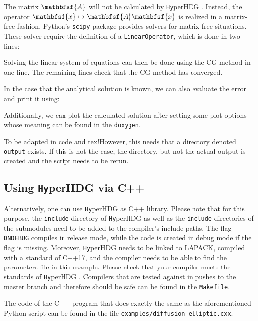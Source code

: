 \documentclass[a4paper, english, 12pt, reqno, draft]{amsart}
\theoremstyle{definition}
\theoremstyle{remark}
\numberwithin{equation}{section}
\newcommand{\hyperHDG}{{\fontfamily{pzc}\selectfont \texttt{Hy}\hspace{-1.5pt}perHDG }}
\newcommand{\vecc}[1]{\ensuremath{\mathbfsf{#1}}}
\newcommand{\code}[1]{\texttt{#1}}
\begin{document}
%
The matrix $\vecc A$ will not be calculated by \hyperHDG. Instead, the operator $\vecc x \mapsto \vecc A \vecc x$ is realized in a matrix-free fashion. Python's \code{scipy} package provides solvers for matrix-free situations. These solver require the definition of a \code{LinearOperator}, which is done in two lines:
%

%
Solving the linear system of equations can then be done using the CG method in one line. The remaining lines check that the CG method has converged.
%

%
In the case that the analytical solution is known, we can also evaluate the error and print it using:
%

%
Additionally, we can plot the calculated solution after setting some plot options whose meaning can be found in the \code{doxygen}.\begin{envarwarning}{To be adapted in code and tex!}However, this needs that a directory denoted \code{output} exists. If this is not the case, the directory, but not the actual output is created and the script needs to be rerun.\end{envarwarning}
%

%
\subsection{Using \hyperHDG via C++}\label{SEC:cpp_program}
%
Alternatively, one can use \hyperHDG as C++ library. Please note that for this purpose, the \code{include} directory of \hyperHDG as well as the \code{include} directories of the submodules need to be added to the compiler's include paths. The flag \code{-DNDEBUG} compiles in release mode, while the code is created in debug mode if the flag is missing. Moreover, \hyperHDG needs to be linked to LAPACK, compiled with a standard of C++17, and the compiler needs to be able to find the parameters file in this example. Please check that your compiler meets the standards of \hyperHDG. Compilers that are tested against in pushes to the master branch and therefore should be safe can be found in the \code{Makefile}.

The code of the C++ program that does exactly the same as the aforementioned Python script can be found in the file \code{examples/\-diffusion\_elliptic.cxx}.
\end{document}
